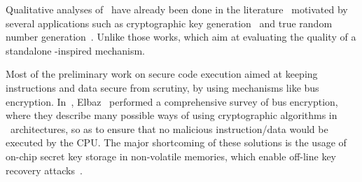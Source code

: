 


Qualitative analyses of \pufs~have already been done in the literature~\cite{Katzenbeisser2012} motivated by several applications such as cryptographic key generation~\cite{Suh2007, Bhargava2014} and true random number generation~\cite{Leest2012, Herrewege2013}. Unlike those works, which aim at evaluating the quality of a standalone \puf-inspired mechanism. %

Most of the preliminary work on secure code execution aimed at keeping instructions and data secure from scrutiny, by using mechanisms like bus encryption. In~\cite{Elbaz2005}, Elbaz \etal~performed a comprehensive survey of bus encryption, where they describe many possible ways of using cryptographic algorithms in \soc~architectures, so as to ensure that no malicious instruction\slash{}data would be executed by the CPU. The major shortcoming of these solutions is the usage of on-chip secret key storage in non-volatile memories, which enable off-line key recovery attacks~\cite{towardshardwaresecurity2010}.

